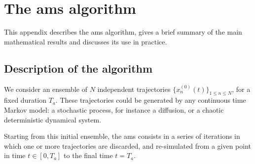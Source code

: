 \newtheorem{theo}{Theorem}

\section{The \ac{ams} algorithm}
\label{app:ams}

This appendix describes the \ac{ams} algorithm, gives a brief summary of the main
mathematical results and discusses its use in practice.
\subsection{Description of the algorithm}
We consider an ensemble of $N$ independent trajectories $\{x_n^{(0)}(t)\}_{1\leq n \leq N}$, for a fixed duration $T_a$.
These trajectories could be generated by any continuous time Markov model: a stochastic process, for instance a diffusion, or a chaotic deterministic dynamical system.

Starting from this initial ensemble, the \ac{ams} consists in a series of iterations in which one or more trajectories are discarded, and re-simulated from a given point in time $t \in [0, T_a]$ to the final time $t = T_a$.

